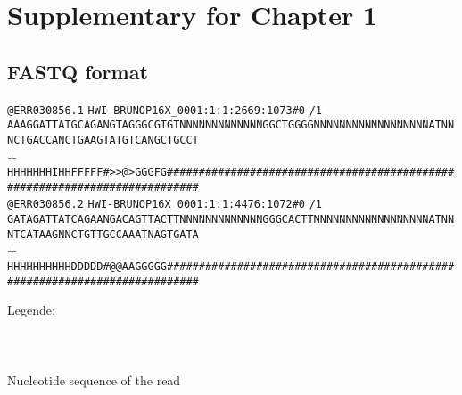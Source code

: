 \chapter{Supplementary for Chapter 1}
\label{ch:SupplIntro}

\section{FASTQ format}\label{sec:fastq_format}

{\color[rgb]{0.447059,0.678431,0.274510}\verb!@ERR030856.1!}
{\color[rgb]{0.500000,0.500000,0.500000}\verb!HWI-BRUNOP16X_0001:1:1:2669:1073#0!}%
{\color[rgb]{1.000000,0.000000,0.000000}\verb!/1!}\\
\verb!AAAGGATTATGCAGANGTAGGGCGTGTNNNNNNNNNNNNNGGCTGGGGNNNNNNNNNNNNNNNNNNATNNNCTGACCANCTGAAGTATGTCANGCTGCCT!\\
{\color[rgb]{0.698039,0.145098,0.450980}+}\\
{\color[rgb]{0.000000,0.000000,0.555711}\verb!HHHHHHHIHHFFFFF#>>@>GGGFG###########################################################################!}\\
{\color[rgb]{0.447059,0.678431,0.274510}\verb!@ERR030856.2!}
{\color[rgb]{0.500000,0.500000,0.500000}\verb!HWI-BRUNOP16X_0001:1:1:4476:1072#0!}%
{\color[rgb]{1.000000,0.000000,0.000000}\verb!/1!}\\
\verb!GATAGATTATCAGAANGACAGTTACTTNNNNNNNNNNNNNGGGCACTTNNNNNNNNNNNNNNNNNNATNNNTCATAAGNNCTGTTGCCAAATNAGTGATA!\\
{\color[rgb]{0.698039,0.145098,0.450980}+}\\
{\color[rgb]{0.000000,0.000000,0.555711}\verb!HHHHHHHHHHDDDDD#@@AAGGGGG###########################################################################!}

{\footnotesize
Legende:\\
\\
\\
\\
\quad\textbullet Nucleotide sequence of the read\\
\\
}


